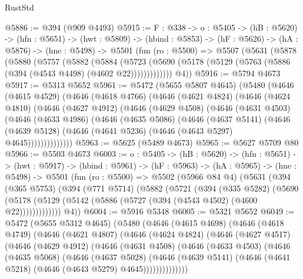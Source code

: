 \begin{lexlean}{RustStd}
\begin{coremodule}
{\begin{coremodule}
{{{{{{{{@5886 := @394 (@909 @4493)
@5915 := {F : @338} ->
  {o : @5405} ->
  (hB : @5620) ->
  (hfn : @5651) ->
  (hwt : @5809) ->
  (hbind : @5853) ->
  (hF : @5626) ->
  (hA : @5876) ->
  (hne : @5498) ->
  @5501
    (fun (ro : @5500) =>
    @5507
      (@5631
        (@5878
          (@5880
            (@5757
              (@5882
                (@5884
                  (@5723
                    (@5690 (@5178 (@5129 (@5763 (@5886 (@394 (@4543 @4498) (@4602 @22)))))))))))))
        @4))
@5916 := @5794 @4673
@5917 := @5313 @5652
@5961 := @5472
    (@5655 @5807 @4645)
    (@5480
      (@4646
        (@4615 @4529)
        (@4646
          (@4618 @4766)
          (@4646
            (@4621 @4824)
            (@4646
              (@4624 @4810)
              (@4646
                (@4627 @4912)
                (@4646
                  (@4629 @4508)
                  (@4646
                    (@4631 @4503)
                    (@4646
                      (@4633 @4986)
                      (@4646
                        (@4635 @5086)
                        (@4646
                          (@4637 @5141)
                          (@4646
                            (@4639 @5128)
                            (@4646 (@4641 @5236) (@4646 (@4643 @5297) @4645))))))))))))))
@5963 := @5625 (@5489 @4673)
@5965 := @5627 @5709 @80
@5966 := @5503 @4673
@6003 := {o : @5405} ->
  (hB : @5620) ->
  (hfn : @5651) ->
  (hwt : @5917) ->
  (hbind : @5961) ->
  (hF : @5963) ->
  (hA : @5965) ->
  (hne : @5498) ->
  @5501
    (fun (ro : @5500) =>
    @5502
      (@5966 @84 @4)
      (@5631
        (@394
          (@365 @5753)
          (@394
            (@771 @5714)
            (@5882
              (@5721
                (@394
                  (@335 @5282)
                  (@5690
                    (@5178 (@5129 (@5142 (@5886 (@5727 (@394 (@4543 @4502) (@4600 @22)))))))))))))
        @4))
@6004 := @5916 @5348
@6005 := @5321 @5652
@6049 := @5472
    (@5655 @5312 @4645)
    (@5480
      (@4646
        (@4615 @4698)
        (@4646
          (@4618 @4749)
          (@4646
            (@4621 @4807)
            (@4646
              (@4624 @4824)
              (@4646
                (@4627 @4517)
                (@4646
                  (@4629 @4912)
                  (@4646
                    (@4631 @4508)
                    (@4646
                      (@4633 @4503)
                      (@4646
                        (@4635 @5068)
                        (@4646
                          (@4637 @5028)
                          (@4646
                            (@4639 @5141)
                            (@4646 (@4641 @5218) (@4646 (@4643 @5279) @4645))))))))))))))
}}}}}}}}
\end{coremodule}}
\end{coremodule}
\end{lexlean}
